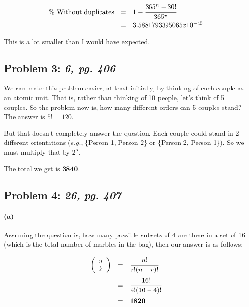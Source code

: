 \documentclass[a4paper]{article}
\begin{document}
\begin{equation}
\begin{array}{rll}
\mbox{\% Without duplicates} & = & 1- \cfrac{365^n-30!}{365^n} \\[.1in]
& = & 3.5881793395065x10^{-45}\\
\end{array}
\end{equation}

This is a lot smaller than I would have expected.

\subsection*{Problem 3: \textit{6, pg. 406}} We can make this problem easier, at least initially, by thinking of each couple as an atomic unit. That is, rather than thinking of 10 people, let's think of 5 couples. So the problem now is, how many different orders can 5 couples stand? The answer is $5! = 120$.

But that doesn't completely answer the question. Each couple could stand in 2 different orientations ($\textit{e.g.}$, \{Person 1, Person 2\} or \{Person 2, Person 1\}). So we must multiply that by $2^5$.

The total we get is $\textbf{3840}$.

\subsection*{Problem 4: \textit{26, pg. 407}}

\paragraph{(a)} Assuming the question is, how many possible subsets of 4 are there in a set of 16 (which is the total number of marbles in the bag), then our answer is as follows:

\begin{equation}
\begin{array}{rll}
\left ( \begin{array}{c} n \\ k \end{array} \right ) & = & \cfrac{n!}{r!(n-r)!} \\[.15in]
& = & \cfrac{16!}{4!(16-4)!} \\[.15in]
& = & \mathbf{1820} \\[.15in]
\end{array}
\end{equation}
\end{document}
